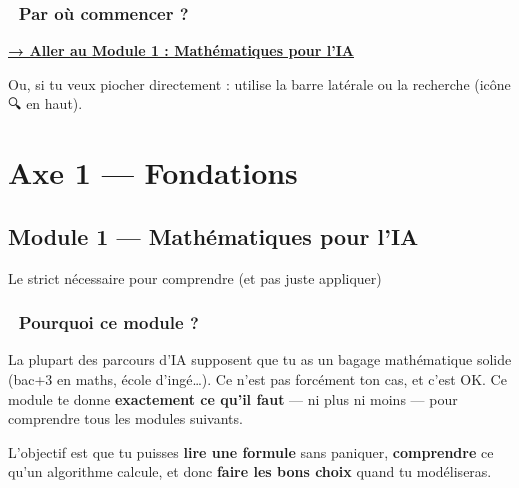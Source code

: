 \documentclass[
  french,
  11pt,
  a4paper,
]{scrbook}
\begin{document}
\section{🚀 Par où commencer ?}\label{par-ouxf9-commencer}

\href{modules/module_01/index.qmd}{\textbf{→ Aller au Module 1 :
Mathématiques pour l'IA}}

Ou, si tu veux piocher directement : utilise la barre latérale ou la
recherche (icône 🔍 en haut).

\part{Axe 1 --- Fondations}

\chapter{Module 1 --- Mathématiques pour
l'IA}\label{module-1-mathuxe9matiques-pour-lia}

Le strict nécessaire pour comprendre (et pas juste appliquer)

\hfill\break

\section{🎯 Pourquoi ce module ?}\label{pourquoi-ce-module}

La plupart des parcours d'IA supposent que tu as un bagage mathématique
solide (bac+3 en maths, école d'ingé\ldots). Ce n'est pas forcément ton
cas, et c'est OK. Ce module te donne \textbf{exactement ce qu'il faut}
--- ni plus ni moins --- pour comprendre tous les modules suivants.

\begin{tcolorbox}[enhanced jigsaw, arc=.35mm, bottomrule=.15mm, bottomtitle=1mm, breakable, colback=white, colbacktitle=quarto-callout-important-color!10!white, colframe=quarto-callout-important-color-frame, coltitle=black, left=2mm, leftrule=.75mm, opacityback=0, opacitybacktitle=0.6, rightrule=.15mm, title=\textcolor{quarto-callout-important-color}{\faExclamation}\hspace{0.5em}{L'objectif n'est pas de faire de toi un mathématicien}, titlerule=0mm, toprule=.15mm, toptitle=1mm]

L'objectif est que tu puisses \textbf{lire une formule} sans paniquer,
\textbf{comprendre} ce qu'un algorithme calcule, et donc \textbf{faire
les bons choix} quand tu modéliseras.

\end{tcolorbox}
\end{document}
